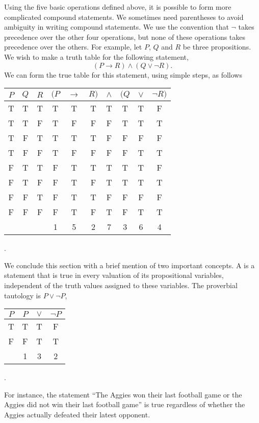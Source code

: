 Using the five basic operations defined above, it is possible to form more complicated compound statements.
We sometimes need parentheses to avoid ambiguity in writing compound statements.
We use the convention that $\neg$ takes precedence over the other four operations, but none of these operations takes precedence over the others.
For example, let $P$, $Q$ and $R$ be three propositions.
We wish to make a truth table for the following statement,
\begin{equation} \label{equation:LogicStatement}
(P \rightarrow R) \wedge (Q \vee \neg R) .
\end{equation}
We can form the true table for this statement, using simple steps, as follows
\begin{center}
\begin{tabular}{|c|c|c|ccccccc|}
\hline
$P$ & $Q$ & $R$
& $(P$ & $\rightarrow$ & $R)$ & $\wedge$ & $(Q$ & $\vee$ & $\neg R)$ \\
\hline
T & T & T & T & T & T & T & T & T & F \\
T & T & F & T & F & F & F & T & T & T \\
T & F & T & T & T & T & F & F & F & F \\
T & F & F & T & F & F & F & F & T & T \\
F & T & T & F & T & T & T & T & T & F \\
F & T & F & F & T & F & T & T & T & T \\
F & F & T & F & T & T & F & F & F & F \\
F & F & F & F & T & F & T & F & T & T \\
& & & 1 & 5 & 2 & 7 & 3 & 6 & 4 \\
\hline
\end{tabular} .
\end{center}

We conclude this section with a brief mention of two important concepts.
A  is a statement that is true in every valuation of its propositional variables, independent of the truth values assigned to these variables.
The proverbial tautology is $P \vee \neg P$,
\begin{center}
\begin{tabular}{|c|ccc|}
\hline
$P$ & $P$ & $\vee$ & $\neg P$ \\
\hline
T & T & T & F \\
F & F & T & T \\
& 1 & 3 & 2 \\
\hline
\end{tabular} .
\end{center}
For instance, the statement ``The Aggies won their last football game or the Aggies did not win their last football game'' is true regardless of whether the Aggies actually defeated their latest opponent.

